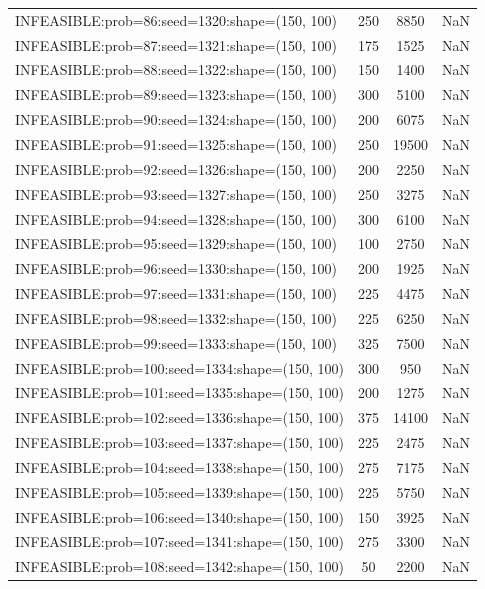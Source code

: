 \begin{longtable}{lccc}
INFEASIBLE:prob=86:seed=1320:shape=(150, 100)  &      250 &  8850 &    NaN \\
INFEASIBLE:prob=87:seed=1321:shape=(150, 100)  &      175 &  1525 &    NaN \\
INFEASIBLE:prob=88:seed=1322:shape=(150, 100)  &      150 &  1400 &    NaN \\
INFEASIBLE:prob=89:seed=1323:shape=(150, 100)  &      300 &  5100 &    NaN \\
INFEASIBLE:prob=90:seed=1324:shape=(150, 100)  &      200 &  6075 &    NaN \\
INFEASIBLE:prob=91:seed=1325:shape=(150, 100)  &      250 & 19500 &    NaN \\
INFEASIBLE:prob=92:seed=1326:shape=(150, 100)  &      200 &  2250 &    NaN \\
INFEASIBLE:prob=93:seed=1327:shape=(150, 100)  &      250 &  3275 &    NaN \\
INFEASIBLE:prob=94:seed=1328:shape=(150, 100)  &      300 &  6100 &    NaN \\
INFEASIBLE:prob=95:seed=1329:shape=(150, 100)  &      100 &  2750 &    NaN \\
INFEASIBLE:prob=96:seed=1330:shape=(150, 100)  &      200 &  1925 &    NaN \\
INFEASIBLE:prob=97:seed=1331:shape=(150, 100)  &      225 &  4475 &    NaN \\
INFEASIBLE:prob=98:seed=1332:shape=(150, 100)  &      225 &  6250 &    NaN \\
INFEASIBLE:prob=99:seed=1333:shape=(150, 100)  &      325 &  7500 &    NaN \\
INFEASIBLE:prob=100:seed=1334:shape=(150, 100) &      300 &   950 &    NaN \\
INFEASIBLE:prob=101:seed=1335:shape=(150, 100) &      200 &  1275 &    NaN \\
INFEASIBLE:prob=102:seed=1336:shape=(150, 100) &      375 & 14100 &    NaN \\
INFEASIBLE:prob=103:seed=1337:shape=(150, 100) &      225 &  2475 &    NaN \\
INFEASIBLE:prob=104:seed=1338:shape=(150, 100) &      275 &  7175 &    NaN \\
INFEASIBLE:prob=105:seed=1339:shape=(150, 100) &      225 &  5750 &    NaN \\
INFEASIBLE:prob=106:seed=1340:shape=(150, 100) &      150 &  3925 &    NaN \\
INFEASIBLE:prob=107:seed=1341:shape=(150, 100) &      275 &  3300 &    NaN \\
INFEASIBLE:prob=108:seed=1342:shape=(150, 100) &       50 &  2200 &    NaN \\

\end{longtable}
